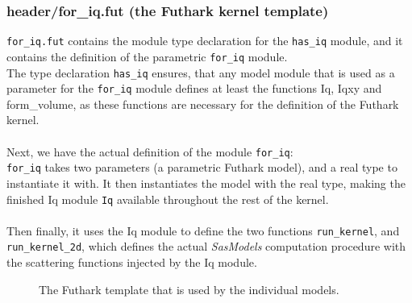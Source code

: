 \documentclass[11pt]{article}
\newcommand{\sasmodels}{\textit{SasModels}}
\newcommand{\foriq}{\texttt{for\_iq}}
\newcommand{\hasiq}{\texttt{has\_iq}}
\begin{document}
\subsubsection{header/for\_iq.fut (the Futhark kernel template)}
\texttt{for\_iq.fut} contains the module type declaration for the \hasiq{} module,
 and it contains the definition of the parametric \foriq{} module. 
\\
The type declaration \hasiq{} ensures, that any model module that is
used as a parameter for the \foriq{} module defines at least the functions
Iq, Iqxy and form\_volume, as these functions are necessary for the definition
of the Futhark kernel.
\\\\
Next, we have the actual definition of the module \foriq{}:
\\
\foriq{} takes two parameters (a parametric Futhark model), and a real type 
to instantiate it with.
It then instantiates the model with the real type, making the finished Iq module
\texttt{Iq} available throughout the rest of the kernel.
\\\\
Then finally, it uses the Iq module to define the two functions 
\texttt{run\_kernel}, and \texttt{run\_kernel\_2d}, which defines the actual 
\sasmodels{} computation procedure with the scattering functions injected by 
the Iq module.

\begin{figure}
  
  \caption{The Futhark template that is used by the individual models.}
  \label{fig:for-iq}
\end{figure}
\end{document}
